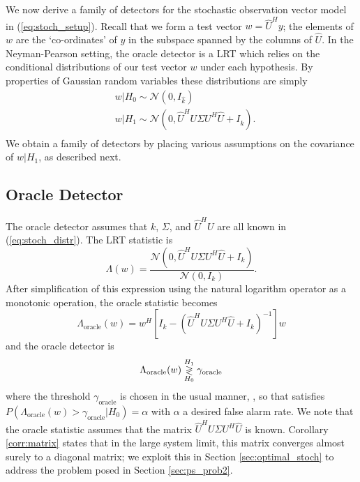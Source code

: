We now derive a family of detectors for the stochastic observation vector model in (\ref{eq:stoch_setup}). Recall that we form a test vector $w=\widehat{U}^Hy$; the elements of $w$ are the `co-ordinates' of $y$ in the subspace spanned by the columns of $\widehat{U}$. In the Neyman-Pearson setting, the oracle detector is a LRT which relies on the conditional distributions of our test vector $w$ under each hypothesis. By properties of Gaussian random variables these distributions are simply
\begin{equation}\label{eq:stoch_distr}
\begin{aligned}
&w|H_0\sim\mathcal{N}\left(0,I_{\widehat{k}}\right)\\
&w|H_1\sim\mathcal{N}\left(0, \widehat{U}^HU\Sigma U^H\widehat{U} +I_{\widehat{k}}\right).\\
\end{aligned}
\end{equation}
We obtain a family of detectors by placing various assumptions on the covariance of $w|H_1$, as described next.

\subsection{Oracle Detector}\label{sec:oracle_stoch}
The oracle detector assumes that $k$, $\Sigma$, and $\widehat{U}^{H}U$ are all known in (\ref{eq:stoch_distr}). The LRT statistic is
\begin{equation*}
\Lambda(w)=\frac{\mathcal{N}(0,\widehat{U}^HU\Sigma U^H\widehat{U} + I_k)}{\mathcal{N}(0,I_{k})}.
\end{equation*}
After simplification of this expression using the natural logarithm operator as a monotonic operation, the oracle statistic becomes
\begin{equation}\label{eq:oracle_stat_stoch}
\boxed{\Lambda_{\text{oracle}}(w) = w^H\left[I_k-\left(\widehat{U}^HU\Sigma U^H\widehat{U}+I_k\right)^{-1}\right]w}
\end{equation}
and the oracle detector is
\begin{equation}\label{eq:oracle_class_stoch}
\Lambda_{\text{oracle}}(w) \detgtrless \gamma_{\text{oracle}}
\end{equation}
where the threshold $\gamma_{\text{oracle}}$ is chosen in the usual manner, \ie, so that satisfies $P(\Lambda_{\text{oracle}}(w)>\gamma_{\text{oracle}}|H_0)=\alpha$ with $\alpha$ a desired false alarm rate. We note that the oracle statistic assumes that the matrix $\widehat{U}^HU\Sigma U^H\widehat{U}$ is known. Corollary \ref{corr:matrix} states that in the large system limit, this matrix converges almost surely to a diagonal matrix; we exploit this in Section \ref{sec:optimal_stoch} to address the problem posed in Section \ref{sec:ps_prob2}.

